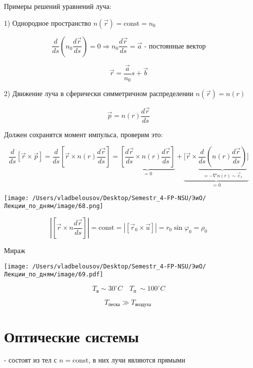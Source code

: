 \documentclass[12pt, a4paper]{report}
\begin{document}
Примеры решений уравнений луча: 

1) Однородное пространство \( n(\vec{r } ) = \mathrm{const} = n_0  \) 

\[ \frac{d}{ds } \left( n_0 \frac{ d \vec{r } }{d s }     \right) = 0 \Rightarrow n_0 \frac{d \vec{r } }{ds} = \vec{a } \text{ - постоянные вектор}  \] 

\[ \vec{r } = \frac{ \vec{a } }{ n_0 }s + \vec{b }   \] 

2) Движение луча в сферически симметричном распределении \( n(\vec{r } ) = n (r ) \) 

\[ \vec{p }  = n ( r ) \frac{ d \vec{r } }{ds}   \] 

Должен сохранятся момент импульса, проверим это:

\[ \frac{d}{ds } [\vec{r } \times  \vec{p } ] = \frac{d}{ds }  \left[ \vec{r } \times  n(r )\frac{d \vec{r } }{d s }  \right] = \underbrace{\left[  \frac{ d \vec{r } }{ ds }\times  n(r ) \frac{ d \vec{r } }{ds}   \right]}_{ = 0} + \underbrace{\bigg[ \vec{r } \times  \underbrace{\frac{d}{ds } \left( n(r ) \frac{ d \vec{r } }{ds}  \right)}_{= - \nabla n(r ) \sim \vec{e } _r} \bigg]}_{= 0}\] 

\begin{center}
    \texttt{[image: /Users/vladbelousov/Desktop/Semestr\_4-FP-NSU/ЭиО/Лекции\_по\_дням/image/68.png]}
\end{center}

\[ \left\lvert [\vec{r } \times  n \frac{ d \vec{r } }{ds } ]  \right\rvert= \mathrm{const }  = \left\lvert [ \vec{r } _0 \times  \vec{u} ] \right\rvert = r_0 \sin \varphi_0 = \rho_0  \] 

Мираж

\begin{center}
    \texttt{[image: /Users/vladbelousov/Desktop/Semestr\_4-FP-NSU/ЭиО/Лекции\_по\_дням/image/69.pdf]}
\end{center}

\[ T_{\text{в} } \sim 30^{\circ } C \quad T_{\text{п }  } \sim  100^{\circ } C    \] 

\[ T_{\text{песка} }\gg T_{\text{воздуха } }   \] 

\section{Оптические системы}

- состоят из тел с \( n = \mathrm{const}   \), в них лучи являются прямыми 
\end{document}
